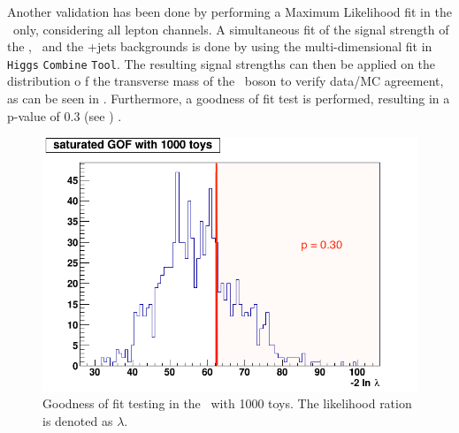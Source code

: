 Another validation has been done by performing a Maximum Likelihood fit in the \WZCR\ only, considering all lepton channels. A simultaneous fit of the signal strength of the \NPE, \NPM\ and the \WZ+jets backgrounds is done by using the multi-dimensional fit in \texttt{Higgs} \texttt{Combine} \texttt{Tool}. The resulting signal strengths can then be applied on the distribution o f the transverse mass of the \PW\ boson to verify data/MC agreement, as can be seen in . Furthermore, a goodness of fit test is performed, resulting in a p-value of 0.3 (see  ) .

\begin{figure}[htbp]
	\centering
	 \includegraphics[width=0.7\linewidth]{6_Search/Figures/GOF/GOF_1000toys}
	\caption{Goodness of fit testing in the \WZCR\  with 1000 toys. The likelihood ration is denoted as $\lambda$.}
	\label{fig:gof}
\end{figure}

